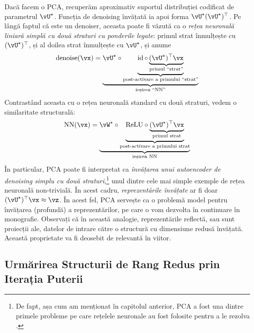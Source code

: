 \documentclass[../../book-main_ro.tex]{subfiles}
\begin{document}
\begin{remark}
    Dacă facem o PCA, recuperăm aproximativ suportul distribuției
    codificat de parametrul \(\vU^{\star}\). Funcția de denoising învățată ia apoi
    forma \(\vU^{\star}(\vU^{\star})^{\top}\). Pe lângă faptul că este
    un denoiser, aceasta poate fi văzută ca o \textit{rețea neuronală liniară simplă
    cu două straturi cu ponderile legate}: primul strat înmulțește cu
    \((\vU^{\star})^{\top}\), și al doilea strat înmulțește cu \(\vU^{\star}\), și anume
    \begin{equation}
        \operatorname{denoise}(\vx) = \underbrace{\vU^{\star} \circ
        \underbrace{\id \circ \underbrace{(\vU^{\star})^{\top}\vx}_{\text{primul ``strat''}}}_{\text{post-activare a primului ``strat''}}}_{\text{ieșirea ``NN''}}
    \end{equation}
    Contrastând aceasta cu o rețea neuronală standard cu două straturi, vedem o similaritate structurală:
    \begin{equation}
        \operatorname{NN}(\vx) = \underbrace{\vW^{\star} \circ
        \underbrace{\mathrm{ReLU} \circ \underbrace{(\vU^{\star})^{\top}\vx}_{\text{primul strat}}}_{\text{post-activare a primului strat}}}_{\text{ieșirea NN}}
    \end{equation}
    În particular, PCA poate fi interpretat ca \textit{învățarea unui autoencoder
    de denoising simplu cu două straturi},\footnote{De fapt, așa cum am menționat în
    capitolul anterior, PCA a fost una dintre primele probleme pe care rețelele neuronale
    au fost folosite pentru a le rezolva \cite{Oja1982SimplifiedNM,Baldi89}.} unul dintre cele mai simple
    exemple de rețea neuronală non-trivială. În acest cadru,
    \textit{reprezentările învățate} ar fi doar \((\vU^{\star})^{\top}\vx \approx \vz\). În acest fel, PCA servește ca o problemă model pentru învățarea (profundă) a reprezentărilor, pe care o vom dezvolta în continuare în monografie. Observați că în această analogie, reprezentările reflectă, sau sunt proiecții ale, datelor de intrare către o structură cu dimensiune redusă învățată. Această proprietate va fi deosebit de relevantă în viitor.
\end{remark}

\subsection{Urmărirea Structurii de Rang Redus prin Iterația Puterii}\label{subsec:power iterations}
\end{document}
